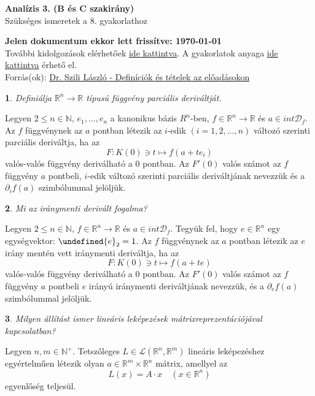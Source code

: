 \documentclass[a4paper]{article}
\def\R{\mathbb{R}}
\def\N{\mathbb{N}}
\theoremstyle{qstyle}
\newtheorem{question}{}{}
\let\norm\undefined %
\DeclarePairedDelimiter\norm{\lVert}{\rVert}
\begin{document}
	\begin{center}
		{\Large\textbf{Analízis 3. (B és C szakirány)}}\\
		{\Large Szükséges ismeretek a 8. gyakorlathoz}
	\end{center}
	
	\begin{framed}
		\textbf{Jelen dokumentum ekkor lett frissítve: {\yyyymmdddate\today} \ \currenttime}\\
		További kidolgozások elérhetőek \href{https://people.inf.elte.hu/totadavid95/Analizis3/2019-tavasz/}{ide kattintva}. A gyakorlatok anyaga \href{http://numanal.inf.elte.hu/~szili/Oktatas/An3_BC_szakirany_2019/An3_BC_gyak_2019_tavasz.pdf}{ide kattintva} érhető el.\\	
		Forrás(ok): \href{http://numanal.inf.elte.hu/~szili/Oktatas/An3_BC_szakirany_2019/An3_BC_ea_def_tetel_2019_tavasz.pdf}{Dr. Szili László - Definíciók és tételek az előadásokon}
	\end{framed}

	\begin{question}
		Definiálja $\R^n \to \R$ típusú függvény parciális deriváltját.
	\end{question}
	Legyen $2\le n \in \N$, $e_1,\dots,e_n$ a kanonikus bázis $R^n$-ben, $f \in \R^n \to \R$ és $a \in int \mathcal{D}_f$. Az $f$ függvénynek az $a$ pontban létezik az $i$-edik $(i=1,2,\dots,n)$ változó szerinti parciális deriváltja, ha az
	$$F : K(0) \ni t \mapsto f(a+te_i)$$
	valós-valós függvény deriválható a 0 pontban. Az $F'(0)$ valós számot az $f$ függvény $a$ pontbeli, $i$-edik változó szerinti parciális deriváltjának nevezzük és a $\partial_i f(a)$ szimbólummal jelöljük.
	
	\begin{question}
		Mi az iránymenti derivált fogalma?
	\end{question}
	Legyen $2\le n \in\N$, $f\in \R^n\to \R$ és $a \in int\mathcal{D}_f$. Tegyük fel, hogy $e \in \R^n$ egy egységvektor: $\norm{e}_2 = 1$. Az $f$ függvénynek az $a$ pontban létezik az $e$ irány mentén vett iránymenti deriváltja, ha az
	$$F : K(0) \ni t \mapsto f(a+te)$$
	valós-valós függvény deriválható a $0$ pontban. Az $F'(0)$ valós számot az $f$ függvény $a$ pontbeli $e$ irányú iránymenti deriváltjának nevezzük, és a $\partial_e f(a)$ szimbólummal jelöljük.

	\begin{question}
		Milyen állítást ismer lineáris leképezések mátrixreprezentációjával kapcsolatban?
	\end{question}
	Legyen $n,m \in \N^+$. Tetszőleges $L \in \mathcal{L}(\R^n,\R^m)$ lineáris leképezéshez egyértelműen létezik olyan $a\in \R^m \times \R^n$ mátrix, amellyel az
	$$L(x) = A \cdot x \quad (x\in \R^n)$$
	egyenlőség teljesül.
\end{document}
